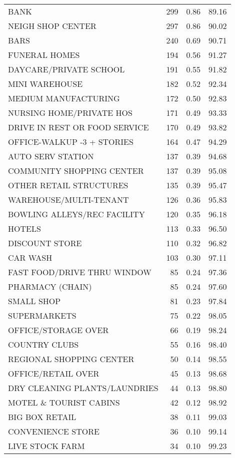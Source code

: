 \documentclass[
]{book}
\theoremstyle{definition}
\theoremstyle{definition}
\theoremstyle{definition}
\theoremstyle{definition}
\theoremstyle{remark}
\begin{document}
\begin{table}
\begin{tabular}[t]{lrrr}
\addlinespace
BANK & 299 & 0.86 & 89.16\\
NEIGH SHOP CENTER & 297 & 0.86 & 90.02\\
BARS & 240 & 0.69 & 90.71\\
FUNERAL HOMES & 194 & 0.56 & 91.27\\
DAYCARE/PRIVATE SCHOOL & 191 & 0.55 & 91.82\\
\addlinespace
MINI WAREHOUSE & 182 & 0.52 & 92.34\\
MEDIUM MANUFACTURING & 172 & 0.50 & 92.83\\
NURSING HOME/PRIVATE HOS & 171 & 0.49 & 93.33\\
DRIVE IN REST OR FOOD SERVICE & 170 & 0.49 & 93.82\\
OFFICE-WALKUP -3 + STORIES & 164 & 0.47 & 94.29\\
\addlinespace
AUTO SERV STATION & 137 & 0.39 & 94.68\\
COMMUNITY SHOPPING CENTER & 137 & 0.39 & 95.08\\
OTHER RETAIL STRUCTURES & 135 & 0.39 & 95.47\\
WAREHOUSE/MULTI-TENANT & 126 & 0.36 & 95.83\\
BOWLING ALLEYS/REC FACILITY & 120 & 0.35 & 96.18\\
\addlinespace
HOTELS & 113 & 0.33 & 96.50\\
DISCOUNT STORE & 110 & 0.32 & 96.82\\
CAR WASH & 103 & 0.30 & 97.11\\
FAST FOOD/DRIVE THRU WINDOW & 85 & 0.24 & 97.36\\
PHARMACY (CHAIN) & 85 & 0.24 & 97.60\\
\addlinespace
SMALL SHOP & 81 & 0.23 & 97.84\\
SUPERMARKETS & 75 & 0.22 & 98.05\\
OFFICE/STORAGE OVER & 66 & 0.19 & 98.24\\
COUNTRY CLUBS & 55 & 0.16 & 98.40\\
REGIONAL SHOPPING CENTER & 50 & 0.14 & 98.55\\
\addlinespace
OFFICE/RETAIL OVER & 45 & 0.13 & 98.68\\
DRY CLEANING PLANTS/LAUNDRIES & 44 & 0.13 & 98.80\\
MOTEL \& TOURIST CABINS & 42 & 0.12 & 98.92\\
BIG BOX RETAIL & 38 & 0.11 & 99.03\\
CONVENIENCE STORE & 36 & 0.10 & 99.14\\
\addlinespace
LIVE STOCK FARM & 34 & 0.10 & 99.23\\

\end{tabular}
\end{table}
\end{document}

